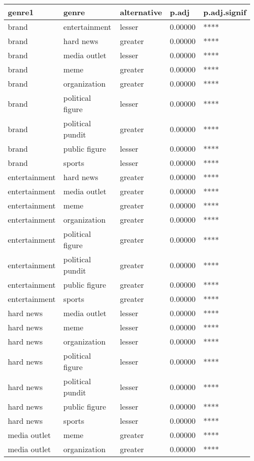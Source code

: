 \begin{table}
\centering
\begin{tabular}[t]{lllll}
\toprule
genre1 & genre & alternative & p.adj & p.adj.signif\\
\midrule
brand & entertainment & lesser & 0.00000 & ****\\
brand & hard news & greater & 0.00000 & ****\\
brand & media outlet & lesser & 0.00000 & ****\\
brand & meme & greater & 0.00000 & ****\\
brand & organization & greater & 0.00000 & ****\\
brand & political figure & lesser & 0.00000 & ****\\
brand & political pundit & greater & 0.00000 & ****\\
brand & public figure & lesser & 0.00000 & ****\\
brand & sports & lesser & 0.00000 & ****\\
entertainment & hard news & greater & 0.00000 & ****\\
entertainment & media outlet & greater & 0.00000 & ****\\
entertainment & meme & greater & 0.00000 & ****\\
entertainment & organization & greater & 0.00000 & ****\\
entertainment & political figure & greater & 0.00000 & ****\\
entertainment & political pundit & greater & 0.00000 & ****\\
entertainment & public figure & greater & 0.00000 & ****\\
entertainment & sports & greater & 0.00000 & ****\\
hard news & media outlet & lesser & 0.00000 & ****\\
hard news & meme & lesser & 0.00000 & ****\\
hard news & organization & lesser & 0.00000 & ****\\
hard news & political figure & lesser & 0.00000 & ****\\
hard news & political pundit & lesser & 0.00000 & ****\\
hard news & public figure & lesser & 0.00000 & ****\\
hard news & sports & lesser & 0.00000 & ****\\
media outlet & meme & greater & 0.00000 & ****\\
media outlet & organization & greater & 0.00000 & ****\\

\end{tabular}
\end{table}
